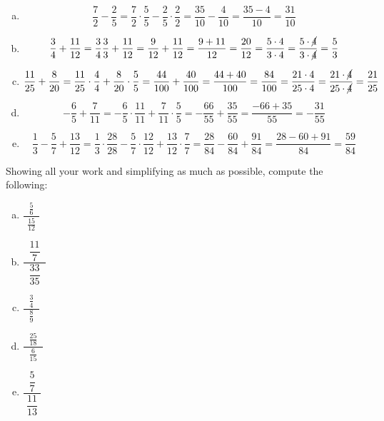 \documentclass[11pt,letterpaper]{article}
\begin{document}
\sol 
\begin{enumerate}[(a)]
\item 
	\[
	\frac{7}{2} - \frac{2}{5}= \frac{7}{2} \cdot \dfrac{5}{5} - \frac{2}{5} \cdot \dfrac{2}{2}= \dfrac{35}{10} - \dfrac{4}{10}= \dfrac{35 - 4}{10}= \dfrac{31}{10}
	\] \pspace

\item 
	\[
	\frac{3}{4} + \frac{11}{12}= \frac{3}{4} \dfrac{3}{3} + \frac{11}{12}= \dfrac{9}{12} + \dfrac{11}{12}= \dfrac{9 + 11}{12}= \dfrac{20}{12}= \dfrac{5 \cdot 4}{3 \cdot 4}= \dfrac{5 \cdot \cancel{4}}{3 \cdot \cancel{4}}= \dfrac{5}{3}
	\] \pspace

\item 
	\[
	\frac{11}{25} + \frac{8}{20}= \frac{11}{25} \cdot \dfrac{4}{4} + \frac{8}{20} \cdot \dfrac{5}{5}= \dfrac{44}{100} + \dfrac{40}{100}= \dfrac{44 + 40}{100}= \dfrac{84}{100}= \dfrac{21 \cdot 4}{25 \cdot 4}= \dfrac{21 \cdot \cancel{4}}{25 \cdot \cancel{4}}= \dfrac{21}{25}
	\] \pspace

\item 
	\[
	-\frac{6}{5} + \frac{7}{11}= -\frac{6}{5} \cdot \dfrac{11}{11} + \frac{7}{11} \cdot \dfrac{5}{5}= -\dfrac{66}{55} + \dfrac{35}{55}= \dfrac{-66 + 35}{55}= -\dfrac{31}{55}
	\] \pspace

\item 
	\[
	\frac{1}{3} - \frac{5}{7} + \frac{13}{12}= \frac{1}{3} \cdot \dfrac{28}{28} - \frac{5}{7} \cdot \dfrac{12}{12} + \frac{13}{12} \cdot \dfrac{7}{7}= \dfrac{28}{84} - \dfrac{60}{84} + \dfrac{91}{84}= \dfrac{28 - 60 + 91}{84}= \dfrac{59}{84}
	\]
\end{enumerate}



\newpage



 Showing all your work and simplifying as much as possible, compute the following:
	\begin{enumerate}[(a)]
	\item $\dfrac{\;\;\frac{5}{6}\;\;}{\frac{15}{12}}$
	\item $\dfrac{\;\;\dfrac{11}{7}\;\;}{\dfrac{33}{35}}$
	\item $\dfrac{\;\;\frac{3}{4}\;\;}{\frac{8}{9}}$
	\item $\dfrac{\;\;\frac{25}{18}\;\;}{\frac{6}{15}}$
	\item $\dfrac{\;\;\dfrac{5}{7}\;\;}{\dfrac{11}{13}}$
	\end{enumerate} \pspace
\end{document}
